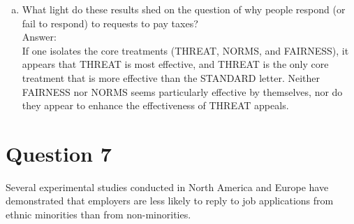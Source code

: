 \documentclass[11pt,notitlepage]{article}\usepackage[]{graphicx}\usepackage[]{color}
\begin{document}
\begin{enumerate}[a)]
\item What light do these results shed on the question of why people respond (or fail to respond) to requests to pay taxes?\\
Answer:\\
 If one isolates the core treatments (THREAT, NORMS, and FAIRNESS), it appears that THREAT is most effective, and THREAT is the only core treatment that is more effective than the STANDARD letter.  Neither FAIRNESS nor NORMS seems particularly effective by themselves, nor do they appear to enhance the effectiveness of THREAT appeals.
\end{enumerate}

\section*{Question 7}
Several experimental studies conducted in North America and Europe have demonstrated that employers are less likely to reply to job applications from ethnic minorities than from non-minorities.
\end{document}
